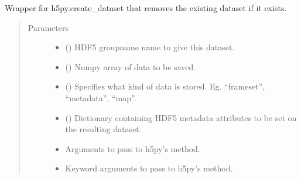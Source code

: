 \documentclass[letterpaper,10pt,english]{sphinxmanual}
\begin{document}
\begin{fulllineitems}
\begin{fulllineitems}
\end{fulllineitems}


\begin{fulllineitems}
\label{\detokenize{xanespy:xanespy.txmstore.TXMStore.replace_dataset}}
Wrapper for h5py.create\_dataset that removes the existing dataset
if it exists.
\begin{quote}\begin{description}
\item[{Parameters}] \leavevmode\begin{itemize}
\item {} 
 () \textendash{} HDF5 groupname name to give this dataset.

\item {} 
 () \textendash{} Numpy array of data to be saved.

\item {} 
 (\sphinxstyleliteralemphasis{, }) \textendash{} Specifies what kind of data is stored. Eg. “frameset”,
“metadata”, “map”.

\item {} 
 (\sphinxstyleliteralemphasis{, }) \textendash{} Dictionary containing HDF5 metadata attributes to be set on
the resulting dataset.

\item {} 
 \textendash{} Arguments to pass to h5py’s  method.

\item {} 
 \textendash{} Keyword arguments to pass to h5py’s  method.

\end{itemize}

\end{description}\end{quote}

\end{fulllineitems}


\end{fulllineitems}
\end{document}

